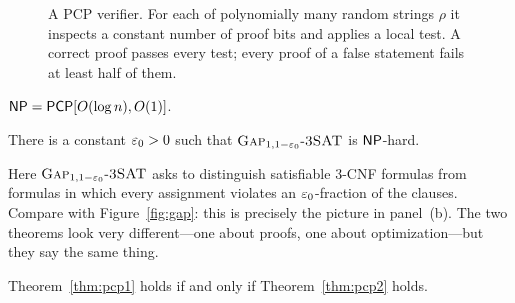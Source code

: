 \begin{figure}[t]
\centering
{}
\caption{A PCP verifier.  For each of polynomially many random strings $\rho$ it inspects a constant
number of proof bits and applies a local test.  A correct proof passes every test; every proof of a
false statement fails at least half of them.}
\label{fig:pcp}
\end{figure}

\begin{theorem}\label{thm:pcp1}
$\mathsf{NP}=\mathsf{PCP}[O(\log n),O(1)]$.
\end{theorem}

\begin{theorem}\label{thm:pcp2}
There is a constant $\varepsilon_0>0$ such that $\textsc{Gap}_{1,1-\varepsilon_0}\text{-}\textsc{3SAT}$ is $\mathsf{NP}$-hard.
\end{theorem}

\noindent
Here $\textsc{Gap}_{1,1-\varepsilon_0}\text{-}\textsc{3SAT}$ asks to distinguish satisfiable $3$-CNF formulas from formulas
in which every assignment violates an $\varepsilon_0$-fraction of the clauses.  Compare with
Figure~\ref{fig:gap}: this is precisely the picture in panel~(b).  The two theorems look very
different---one about proofs, one about optimization---but they say the same thing.

\begin{proposition}\label{prop:pcp-equiv}
Theorem~\ref{thm:pcp1} holds if and only if Theorem~\ref{thm:pcp2} holds.
\end{proposition}

